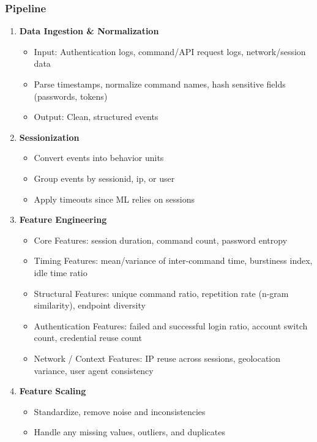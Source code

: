 \documentclass{article}
\begin{document}
\subsubsection{Pipeline}
\begin{enumerate}
    \item \textbf{Data Ingestion \& Normalization}
    \begin{itemize}
        \item Input: Authentication logs, command/API request logs, network/session data
        \item Parse timestamps, normalize command names, hash sensitive fields (passwords, tokens)
        \item Output: Clean, structured events 
    \end{itemize}
    \item \textbf{Sessionization}
    \begin{itemize}
        \item Convert events into behavior units
        \item Group events by sessionid, ip, or user
        \item Apply timeouts since ML relies on sessions 
    \end{itemize}
    \item \textbf{Feature Engineering}
    \begin{itemize}
        \item Core Features: session duration, command count, password entropy
        \item Timing Features: mean/variance of inter-command time, burstiness index, idle time ratio
        \item Structural Features: unique command ratio, repetition rate (n-gram similarity), endpoint diversity
        \item Authentication Features: failed and successful login ratio, account switch count, credential reuse count
        \item Network / Context Features: IP reuse across sessions, geolocation variance, user agent consistency
    \end{itemize}
    \item \textbf{Feature Scaling}
    \begin{itemize}
        \item Standardize, remove noise and inconsistencies
        \item Handle any missing values, outliers, and duplicates
    \end{itemize}

\end{enumerate}
\end{document}
